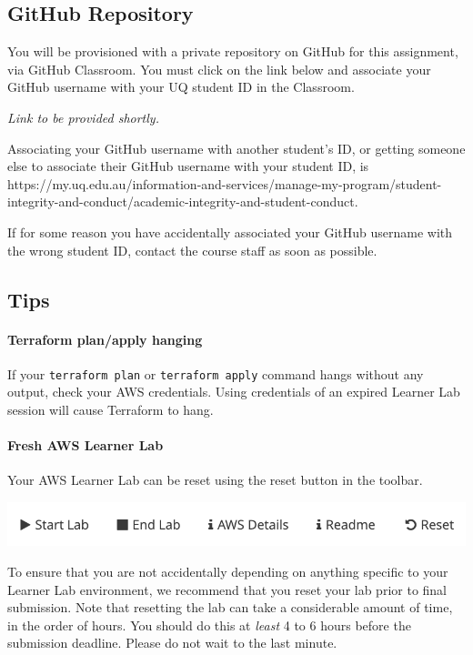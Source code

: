 \documentclass{csse4400}
\begin{document}
\subsection{GitHub Repository}\label{sec:github}
You will be provisioned with a private repository on GitHub for this assignment, via GitHub Classroom. You must click on the link below and associate your GitHub username with your UQ student ID in the Classroom.

\emph{Link to be provided shortly.}

\noindent
Associating your GitHub username with another student's ID, or getting someone else to associate their GitHub username with your student ID, is  {https://my.uq.edu.au/information-and-services/manage-my-program/student-integrity-and-conduct/academic-integrity-and-student-conduct}.

If for some reason you have accidentally associated your GitHub username with the wrong student ID, contact the course staff as soon as possible.

\subsection{Tips}

\paragraph{Terraform plan/apply hanging}
If your \texttt{terraform plan} or \texttt{terraform apply} command hangs without any output, check your AWS credentials. Using credentials of an expired Learner Lab session will cause Terraform to hang.

\paragraph{Fresh AWS Learner Lab}
Your AWS Learner Lab can be reset using the reset button in the toolbar.

\noindent
\includegraphics[width=\textwidth]{images/reset-button.png}

\noindent
To ensure that you are not accidentally depending on anything specific to your Learner Lab environment, we recommend that you reset your lab prior to final submission. Note that resetting the lab can take a considerable amount of time, in the order of hours. You should do this at \textit{least} 4 to 6 hours before the submission deadline. Please do not wait to the last minute.
\end{document}
